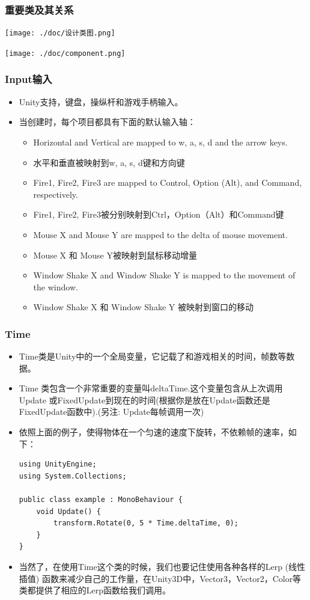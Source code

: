 \documentclass[9pt, b5paper]{article}
\begin{document}
\subsubsection{重要类及其关系}
\label{sec:orge20bf8d}
\begin{center}
\texttt{[image: ./doc/设计类图.png]}
\end{center}

\begin{center}
\texttt{[image: ./doc/component.png]}
\end{center}

\subsubsection{Input输入}
\label{sec:org88045f1}
\begin{itemize}
\item Unity支持，键盘，操纵杆和游戏手柄输入。
\item 当创建时，每个项目都具有下面的默认输入轴：
\begin{itemize}
\item Horizontal and Vertical are mapped to w, a, s, d and the arrow keys.
\item 水平和垂直被映射到w, a, s, d键和方向键
\item Fire1, Fire2, Fire3 are mapped to Control, Option (Alt), and Command, respectively.
\item Fire1, Fire2, Fire3被分别映射到Ctrl，Option（Alt）和Command键
\item Mouse X and Mouse Y are mapped to the delta of mouse movement.
\item Mouse X 和 Mouse Y被映射到鼠标移动增量
\item Window Shake X and Window Shake Y is mapped to the movement of the window.
\item Window Shake X 和 Window Shake Y 被映射到窗口的移动
\end{itemize}
\end{itemize}
\subsubsection{Time}
\label{sec:org7cb0904}
\begin{itemize}
\item Time类是Unity中的一个全局变量，它记载了和游戏相关的时间，帧数等数据。
\item Time 类包含一个非常重要的变量叫deltaTime.这个变量包含从上次调用Update 或FixedUpdate到现在的时间(根据你是放在Update函数还是FixedUpdate函数中).(另注: Update每帧调用一次)
\item 依照上面的例子，使得物体在一个匀速的速度下旋转，不依赖帧的速率，如下：
\begin{verbatim}
using UnityEngine;
using System.Collections;

public class example : MonoBehaviour {
    void Update() {
        transform.Rotate(0, 5 * Time.deltaTime, 0);
    }
}
\end{verbatim}
\item 当然了，在使用Time这个类的时候，我们也要记住使用各种各样的Lerp (线性插值) 函数来减少自己的工作量，在Unity3D中，Vector3，Vector2，Color等类都提供了相应的Lerp函数给我们调用。
\end{itemize}
\end{document}
